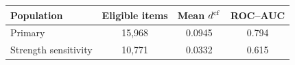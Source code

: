 \begin{tabular}{lccc}
\toprule
Population & Eligible items & Mean $d^{\rm cf}$ & ROC--AUC \\
\midrule
Primary & 15,968 & 0.0945 & 0.794 \\
Strength sensitivity & 10,771 & 0.0332 & 0.615 \\
\bottomrule
\end{tabular}
